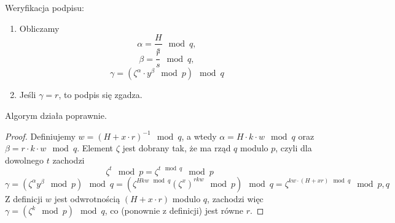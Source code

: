 \begin{greyframe}
    Weryfikacja podpisu:
    \begin{enumerate}
        \item Obliczamy
        \[
            \alpha = \frac{H}{s} \mod q,
        \]
        \[
            \beta = \frac{r}{s} \mod q,
        \]
        \[
            \gamma = (\zeta^{\alpha} \cdot y^{\beta} \mod p) \mod q
        \]
        \item Jeśli \( \gamma = r \), to podpis się zgadza.
    \end{enumerate}
\end{greyframe}

Algorym działa poprawnie.
\begin{proof}
    Definiujemy \( w = (H + x \cdot r)^{-1} \mod q \), a wtedy \( \alpha = H \cdot k \cdot w \mod q \) oraz \( \beta = r \cdot k \cdot w \mod q \).
    Element \( \zeta \) jest dobrany tak, że ma rząd \( q \) modulo \( p \), czyli dla dowolnego \( t \) zachodzi 
    \[
        \zeta^t \mod p = \zeta^{t \!\!\mod q} \mod p
    \]
    \[
        \gamma = (\zeta^{\alpha} y^{\beta} \!\!\mod p) \!\!\mod q = (\zeta^{H k w \!\!\!\mod q} (\zeta^{x})^{r k w} \!\!\mod p) \!\!\mod q  = \zeta^{k w \cdot (H + x r) \!\!\!\mod q} \!\!\mod p, q
    \]
    Z definicji \( w \) jest odwrotnością \( (H + x \cdot r) \) modulo \( q \), zachodzi więc \( \gamma = (\zeta^k \mod p) \mod q \), co (ponownie z definicji) jest równe \( r \).
\end{proof}